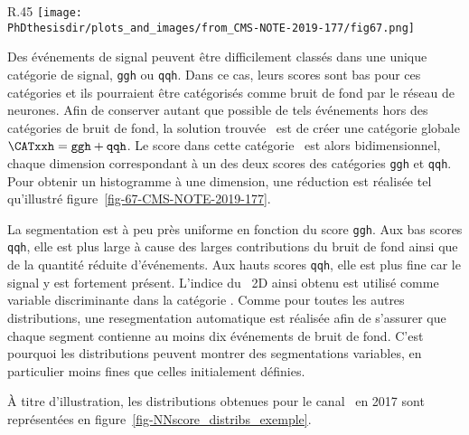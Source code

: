 \begin{wrapfigure}{R}{.45\textwidth}
\centering
\texttt{[image: \\PhDthesisdir/plots\_and\_images/from\_CMS-NOTE-2019-177/fig67.png]}
\caption[Réduction à une dimension de la catégorie \CATxxh.]{Réduction à une dimension de la catégorie \CATxxh~\cite{CMS-NOTE-2019-177}.}
\label{fig-67-CMS-NOTE-2019-177}
\end{wrapfigure}
\par
Des événements de signal peuvent être difficilement classés dans une unique catégorie de signal, \texttt{ggh} ou \texttt{qqh}.
Dans ce cas, leurs scores sont bas pour ces catégories et ils pourraient être catégorisés comme bruit de fond par le réseau de neurones.
Afin de conserver autant que possible de tels événements hors des catégories de bruit de fond,
la solution trouvée~\cite{CMS-NOTE-2019-177} est de créer une catégorie globale $\CATxxh=\texttt{ggh} + \texttt{qqh}$.
Le score dans cette catégorie \CATxxh\ est alors bidimensionnel, chaque dimension correspondant à un des deux scores des catégories \texttt{ggh} et \texttt{qqh}.
Pour obtenir un histogramme à une dimension, une réduction est réalisée tel qu'illustré figure~\ref{fig-67-CMS-NOTE-2019-177}.
\par
La segmentation est à peu près uniforme en fonction du score \texttt{ggh}.
Aux bas scores \texttt{qqh}, elle est plus large à cause des larges contributions du bruit de fond ainsi que de la quantité réduite d'événements.
Aux hauts scores \texttt{qqh}, elle est plus fine car le signal y est fortement présent.
L'indice du \NNscore\ 2D ainsi obtenu est utilisé comme variable discriminante dans la catégorie \CATxxh.
Comme pour toutes les autres distributions, une resegmentation automatique est réalisée afin de s'assurer que chaque segment contienne au moins dix événements de bruit de fond.
C'est pourquoi les distributions peuvent montrer des segmentations variables, en particulier moins fines que celles initialement définies.
\par
À titre d'illustration, les distributions obtenues pour le canal \ele\mu\ en 2017 sont représentées en figure~\ref{fig-NNscore_distribs_exemple}.